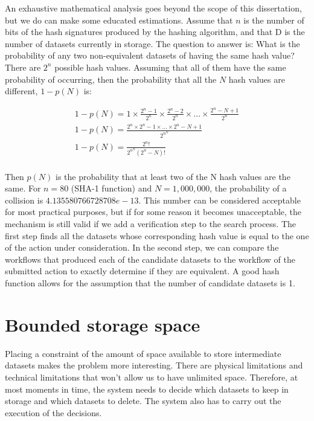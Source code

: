 An exhaustive mathematical analysis goes beyond the scope of this dissertation, but we do can make some educated estimations.  Assume that $n$ is the number of bits of the hash signatures produced by the hashing algorithm, and that D is the number of datasets currently in storage.  The question to answer is: What is the probability of any two non-equivalent datasets of having the same hash value?  There are $2^n$ possible hash values.  Assuming that all of them have the same probability of occurring, then the probability that all the $N$ hash values are different, $1 - p(N)$ is:

\begin{multline}
	1 - p(N) = 1 \times \frac{2^n - 1}{2^n} \times \frac{2^n - 2}{2^n} \times . . . \times \frac{2^n - N + 1}{2^n} \\ 
	1 - p(N) = \frac{2^n \times 2^n - 1 \times . . . \times 2^n - N + 1}{2^{n^{N}}} \\ 
	1 - p(N) = \frac{2^n !}{2^{n{^N}} (2^n - N)!} \\
\end{multline}

Then $p(N)$ is the probability that at least two of the N hash values are the same.  For $n=80$ (SHA-1 function) and $N=1,000,000$, the probability of a collision is $4.135580766728708e-13$.  This number can be considered acceptable for most practical purposes, but if for some reason it becomes unacceptable, the mechanism is still valid if we add a verification step to the search process.  The first step finds all the datasets whose corresponding hash value is equal to the one of the action under consideration.  In the second step, we can compare the workflows that produced each of the candidate  datasets to the workflow of the submitted action to exactly determine if they are equivalent.  A good hash function allows for the assumption that the number of candidate datasets is 1.

\section{Bounded storage space}
Placing a constraint of the amount of space available to store intermediate datasets makes the problem more interesting. There are physical limitations and technical limitations that won't allow us to have unlimited space.  Therefore, at most moments in time, the system needs to decide which datasets to keep in storage and which datasets to delete. The system also has to carry out the execution of the decisions.

